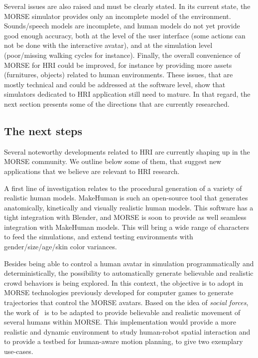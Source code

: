 \documentclass{llncs}
\begin{document}
Several issues are also raised and must be clearly stated. In its current state,
the MORSE simulator provides only an incomplete model of the environment.
Sounds/speech models are incomplete, and human models do not yet provide good
enough accuracy, both at the level of the user interface (some actions can not
be done with the interactive avatar), and at the simulation level (poor/missing
walking cycles for instance). Finally, the overall convenience of MORSE for HRI
could be improved, for instance by providing more assets (furnitures, objects)
related to human environments. These issues, that are mostly technical and could
be addressed at the software level, show that simulators dedicated to HRI
application still need to mature. In that regard, the next section presents some
of the directions that are currently researched.

\subsection*{The next steps}

Several noteworthy developments related to HRI are currently shaping up in the
MORSE community. We outline below some of them, that suggest new applications
that we believe are relevant to HRI research.

A first line of investigation relates to the procedural generation of a variety
of realistic human models. {\sc MakeHuman} is such an open-source tool that
generates anatomically, kinetically and visually realistic human models. This
software has a tight integration with Blender, and MORSE is soon to provide as
well seamless integration with {\sc MakeHuman} models. This will bring a wide
range of characters to feed the simulations, and extend testing environments
with gender/size/age/skin color variances.

Besides being able to control a human avatar in simulation programmatically and
deterministically, the possibility to automatically generate believable and
realistic crowd behaviors is being explored. In this context, the objective is
to adopt in MORSE technologies previously developed for computer games to generate
trajectories that control the MORSE avatars. Based on the idea of \emph{social
forces}, the work of~\cite{Szymanezyk2012crowd} is to be
adapted to provide believable and realistic movement of several humans within
MORSE. This
implementation would provide a more realistic and dynamic environment to study
human-robot spatial interaction and to provide a testbed for human-aware motion
planning, to give two exemplary use-cases.
\end{document}
